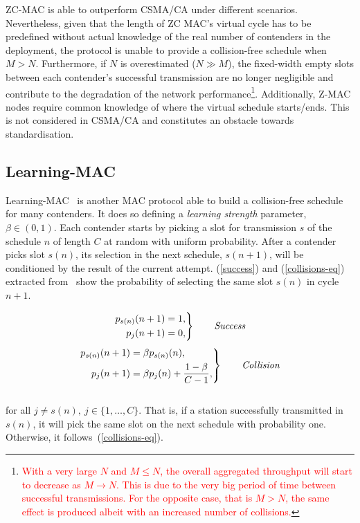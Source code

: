 ZC-MAC is able to outperform CSMA/CA under different scenarios. Nevertheless, given that the length of ZC MAC's virtual cycle has to be predefined without actual knowledge of the real number of contenders in the deployment, the protocol is unable to provide a collision-free schedule when $M>N$. Furthermore, if $N$ is overestimated ($N\gg M$), the fixed-width empty slots between each contender's successful transmission are no longer negligible and contribute to the degradation of the network performance\textcolor{red}{\footnote{\textcolor{red}{With a very large $N$ and $M\leq N$, the overall aggregated throughput will start to decrease as $M\rightarrow N$. This is due to the very big period of time between successful transmissions. For the opposite case, that is $M>N$, the same effect is produced albeit with an increased number of collisions.}}}. Additionally, Z-MAC nodes require common knowledge of where the virtual schedule starts/ends. This is not considered in CSMA/CA and constitutes an obstacle towards standardisation.

\subsection{Learning-MAC}

Learning-MAC~\cite{L_MAC} is another MAC protocol able to build a collision-free schedule for many contenders. It does so defining a \emph{learning strength} parameter, $\beta\in(0,1)$. Each contender starts by picking a slot for transmission $s$ of the schedule $n$ of length $C$ at random with uniform probability. After a contender picks slot $s(n)$, its selection in the next schedule, $s(n+1)$, will be conditioned by the result of the current attempt. (\ref{success}) and (\ref{collisions-eq}) extracted from~\cite{L_MAC} show the probability of selecting the same slot $s(n)$ in cycle $n+1$.

\begin{equation} \label{success}
		\left. \begin{aligned}
			p_{s(n)}(n+1)&=1,\\
			p_{j}(n+1)&=0,
		\end{aligned}
	\right\}
	\qquad \text{\emph{Success}}
\end{equation}
\begin{equation} \label{collisions-eq}
	\left. \begin{aligned}
			p_{s(n)}(n+1)&=\beta p_{s(n)}(n),\\
			p_{j}(n+1)&=\beta p_{j}(n)+\frac{1-\beta}{C -1},
		\end{aligned}
	\right\}
	\qquad \text{\emph{Collision}}
\end{equation}
\\
for all $j\neq s(n),~j\in \{1,\dots ,C\}$. That is, if a station successfully transmitted in $s(n)$, it will pick the same slot on the next schedule with probability one. Otherwise, it follows~(\ref{collisions-eq}).

